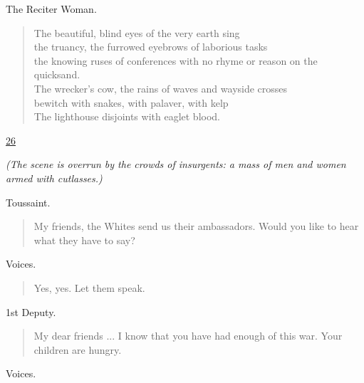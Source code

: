 \documentclass[letterpaper,article,12pt,oneside,notitlepage]{memoir}
\begin{document}
\begin{center}The Reciter Woman.\end{center}

\begin{verse}
The beautiful, blind eyes of the very earth sing \\
the truancy, the furrowed eyebrows of laborious tasks \\
the knowing ruses of conferences with no rhyme or reason on the quicksand. \\
The wrecker's cow, the rains of waves and wayside crosses \\
bewitch with snakes, with palaver, with kelp \\
The lighthouse disjoints with eaglet blood. \\
\end{verse}

\clearpage

\href{http://cesaire.elotroalex.com/chiens/chiens/p026.html}{26}

\textit{(The scene is overrun by the crowds of insurgents: a mass of men and women armed with cutlasses.)}

\begin{center}Toussaint.\end{center}

\begin{verse}
\indent My friends, the Whites send us their ambassadors. Would you like to hear what they have to say? \\
\end{verse}

\begin{center}Voices.\end{center}

\begin{verse}
\hspace{1cm} Yes, yes. Let them speak. \\
\end{verse}

\begin{center}1st Deputy.\end{center}

\begin{verse}
\indent My dear friends ... I know that you have had enough of this war. Your children are hungry. \\
\end{verse}

\begin{center}Voices.\end{center}
\end{document}

